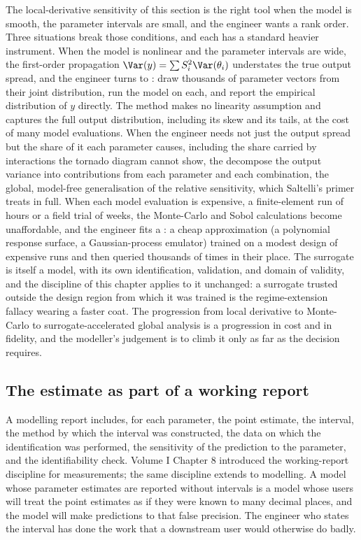 \begin{mastery}
The local-derivative sensitivity of this section is the right tool when
the model is smooth, the parameter intervals are small, and the engineer
wants a rank order. Three situations break those conditions, and each has
a standard heavier instrument. When the model is nonlinear and the
parameter intervals are wide, the first-order propagation
$\Var(y) = \sum S_i^2 \Var(\theta_i)$ understates the true output spread,
and the engineer turns to : draw thousands of parameter vectors from their joint
distribution, run the model on each, and report the empirical distribution
of $y$ directly. The method makes no linearity assumption and captures the
full output distribution, including its skew and its tails, at the cost of
many model evaluations. When the engineer needs not just the output spread
but the share of it each parameter causes, including the share carried by
interactions the tornado diagram cannot show, the 
decompose the output variance into contributions from each parameter and
each combination, the global, model-free generalisation of the relative
sensitivity, which Saltelli's primer
\cite{text:v2ch18-saltelli-sensitivity-2008} treats in full. When each
model evaluation is expensive, a finite-element run of hours or a field
trial of weeks, the Monte-Carlo and Sobol calculations become
unaffordable, and the engineer fits a : a cheap
approximation (a polynomial response surface, a Gaussian-process emulator)
trained on a modest design of expensive runs and then queried thousands of
times in their place. The surrogate is itself a model, with its own
identification, validation, and domain of validity, and the discipline of
this chapter applies to it unchanged: a surrogate trusted outside the
design region from which it was trained is the regime-extension fallacy
wearing a faster coat. The progression from local derivative to
Monte-Carlo to surrogate-accelerated global analysis is a progression in
cost and in fidelity, and the modeller's judgement is to climb it only as
far as the decision requires.
\end{mastery}

\subsection{The estimate as part of a working report}

A modelling report includes, for each parameter, the point
estimate, the interval, the method by which the interval was
constructed, the data on which the identification was performed,
the sensitivity of the prediction to the parameter, and the
identifiability check. Volume I Chapter 8 introduced the
working-report discipline for measurements; the same discipline
extends to modelling. A model whose parameter estimates are
reported without intervals is a model whose users will treat
the point estimates as if they were known to many decimal
places, and the model will make predictions to that false
precision. The engineer who states the interval has done the
work that a downstream user would otherwise do badly.

